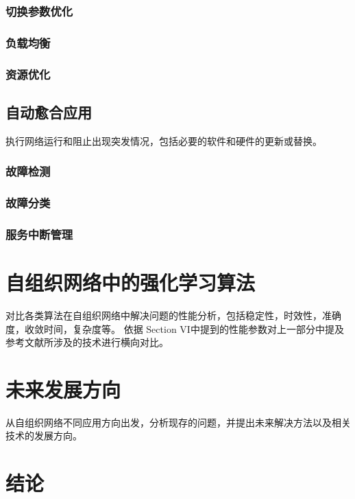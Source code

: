 \documentclass{IEEEtran}
\begin{document}
\subsubsection{切换参数优化}
\subsubsection{负载均衡}
\subsubsection{资源优化}



\subsection{自动愈合应用}

执行网络运行和阻止出现突发情况，包括必要的软件和硬件的更新或替换。
\subsubsection{故障检测}
\subsubsection{故障分类}
\subsubsection{服务中断管理}

\section{自组织网络中的强化学习算法}
\label{sec:Compare}
对比各类算法在自组织网络中解决问题的性能分析，包括稳定性，时效性，准确度，收敛时间，复杂度等。
依据 \cite{Klaine2017} Section  VI中提到的性能参数对上一部分中提及参考文献所涉及的技术进行横向对比。

\section{未来发展方向}
\label{sec:Conclusion}
从自组织网络不同应用方向出发，分析现存的问题，并提出未来解决方法以及相关技术的发展方向。

\section{结论}





\end{document}
